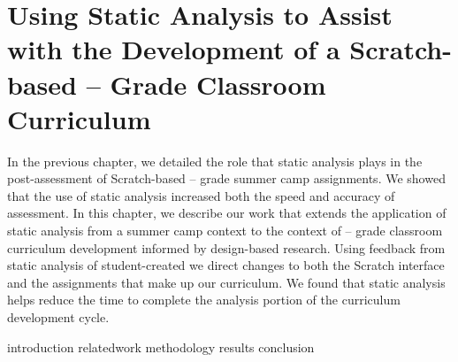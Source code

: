 \chapter{Using Static Analysis to Assist with the Development of a
  Scratch-based -- Grade Classroom Curriculum}
\label{chap:curriculum}

\def\currentprefix{curriculum}

In the previous chapter, we detailed the role that static analysis plays in the
post-assessment of Scratch-based -- grade summer camp
assignments. We showed that the use of static analysis increased both the speed
and accuracy of assessment. In this chapter, we describe our work that extends
the application of static analysis from a summer camp context to the context of
-- grade classroom curriculum development informed by
design-based research. Using feedback from static analysis of student-created
 we direct changes to both the Scratch interface and the
assignments that make up our curriculum. We found that static analysis helps
reduce the time to complete the analysis portion of the curriculum development
cycle.

\iffull
{introduction}
{relatedwork}
{methodology}
{results}
{conclusion}
\fi
